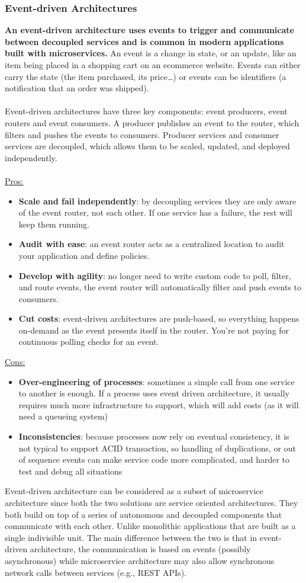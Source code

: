 \documentclass[10pt,a4paper]{article}
\newcommand{\nline}{\\~\\}
\begin{document}
\subsubsection{Event-driven Architectures}
\textbf{An event-driven architecture uses events to trigger and communicate between decoupled services and is common in modern applications built with microservices.} An event is a change in state, or an update, like an item being placed in a shopping cart on an ecommerce website. Events can either carry the state (the item purchased, its price…) or events can be identifiers (a notification that an order was shipped).
\nline
Event-driven architectures have three key components: event producers, event routers and event consumers. A producer publishes an event to the router, which filters and pushes the events to consumers. Producer services and consumer services are decoupled, which allows them to be scaled, updated, and deployed independently.
\nline
\uline{Pros:}
\begin{itemize}
	\item \textbf{Scale and fail independently}: by decoupling services they are only aware of the event router, not each other. If one service has a failure, the rest will keep them running.
	\item \textbf{Audit with ease}: an event router acts as a centralized location to audit your application and define policies.
	\item \textbf{Develop with agility}: no longer need to write custom code to poll, filter, and route events, the event router will automatically filter and push events to consumers.
	\item \textbf{Cut costs}: event-driven architectures are push-based, so everything happens on-demand as the event presents itself in the router. You’re not paying for continuous polling checks for an event.
\end{itemize}
\uline{Cons:}
\begin{itemize}
	\item \textbf{Over-engineering of processes}: sometimes a simple call from one service to another is enough. If a process uses event driven architecture, it usually requires much more infrastructure to support, which will add costs (as it will need a queueing system)
	\item \textbf{Inconsistencies}: because processes now rely on eventual consistency, it is not typical to support ACID transaction, so handling of duplications, or out of sequence events can make service code more complicated, and harder to test and debug all situations
\end{itemize}
Event-driven architecture can be considered as a subset of microservice architecture since both the two solutions are service oriented architectures. They both build on top of a series of autonomous and decoupled components that communicate with each other. Unlike monolithic applications that are built as a single indivisible unit. The main difference between the two is that in event-driven architecture, the communication is based on events (possibly asynchronous) while microservice architecture may also allow synchronous network calls between services (e.g., REST APIs).
\end{document}
